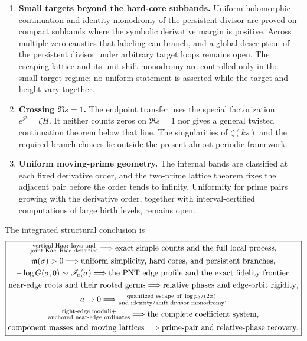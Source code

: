 \documentclass[11pt]{article}
\theoremstyle{definition}
\theoremstyle{remark}
\newcommand{\cP}{\mathcal P}
\begin{document}
\begin{enumerate}
\item \textbf{Small targets beyond the hard-core subbands.}
Uniform holomorphic continuation and identity monodromy of the persistent
divisor are proved on compact subbands where the symbolic derivative margin is
positive.  Across multiple-zero caustics that labeling can branch, and a global
description of the persistent divisor under arbitrary target loops remains
open.  The escaping lattice and its unit-shift monodromy are controlled only in
the small-target regime; no uniform statement is asserted while the target and
height vary together.

\item \textbf{Crossing $\Re s=1$.}
The endpoint transfer uses the special factorization
$e^{\cP}=\zeta H$.  It neither counts zeros on $\Re s=1$ nor gives a general
twisted continuation theorem below that line.  The singularities of
$\zeta(ks)$ and the required branch choices lie outside the present
almost-periodic framework.

\item \textbf{Uniform moving-prime geometry.}
The internal bands are classified at each fixed derivative order, and the
two-prime lattice theorem fixes the adjacent pair before the order tends to
infinity.  Uniformity for prime pairs growing with the derivative order, together
with interval-certified computations of large birth levels, remains open.
\end{enumerate}

\medskip
\noindent
The integrated structural conclusion is
\[
\boxed{
\begin{gathered}
 \substack{\text{vertical Haar laws and}\\
           \text{joint Kac--Rice densities}}
   \Longrightarrow \text{exact simple counts and the full local process},\\
 \mathfrak m(\sigma)>0
   \Longrightarrow \text{uniform simplicity, hard cores, and persistent branches},\\
 -\log G(\sigma,0)\sim\mathscr I_{\rm e}(\sigma)
   \Longrightarrow \text{the PNT edge profile and the exact fidelity frontier},\\
 \text{near-edge roots and their rooted germs}
   \Longrightarrow \text{relative phases and edge-orbit rigidity},\\
 a\to0
   \Longrightarrow
   \substack{\text{quantized escape of }\log p_0/(2\pi)\\
             \text{and identity/shift divisor monodromy}},\\
 \substack{\text{right-edge moduli}+\\
           \text{anchored near-edge ordinates}}
   \Longrightarrow \text{the complete coefficient system},\\
 \text{component masses and moving lattices}
   \Longrightarrow \text{prime-pair and relative-phase recovery}.
\end{gathered}}
\]
\end{document}

